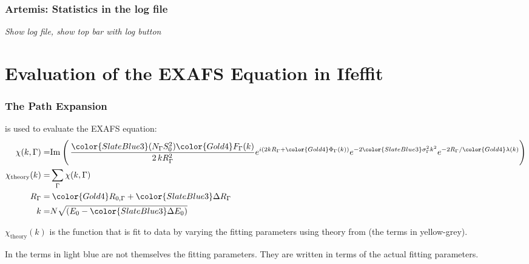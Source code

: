 \documentclass[10pt, xcolor=x11names, compress]{beamer}
\newcommand{\TheBigLesson}{%
  \begin{alertblock}{}
    In {\ifeffit} the {\color{SlateBlue3}terms in light blue} are not
    themselves the fitting parameters.  They are \alert{written in
      terms of} the actual fitting parameters.
  \end{alertblock}
}
\begin{document}

\begin{frame}
  \frametitle{Artemis: Statistics in the log file}
  
  \begin{center}

    \textit{Show log file, show top bar with log button}
  \end{center}
\end{frame}


\section[Ifeffit]{Evaluation of the EXAFS Equation in Ifeffit}
\begin{frame}
  \frametitle{The Path Expansion}

  {\ifeffit} is used to evaluate the EXAFS equation:
  {\small
    \begin{align}
      \chi(k,\Gamma) =& {\Im}\>\Biggl(\, %
      { \frac{{\color{SlateBlue3}(N_\Gamma S_0^2)}{\color{Gold4}F_\Gamma(k)}}
        {2\,kR_\Gamma^2} }
      e^{i(2kR_\Gamma + {\color{Gold4}\Phi_\Gamma(k)})}
      e^{-2{\color{SlateBlue3}\sigma_\Gamma^2}k^2}
      e^{-2R_\Gamma/{\color{Gold4}\lambda(k)}}
      \Biggl) \\
      \chi_{\mathrm{theory}}(k) =& \sum\limits_{\Gamma}\chi(k,\Gamma) \notag\\
      R_\Gamma =& \> {\color{Gold4}R_{0,\Gamma}} +
      {\color{SlateBlue3}\Delta R_\Gamma} \\
      k =& N\sqrt{(E_0 - {\color{SlateBlue3}\Delta E_0})}
    \end{align}}

  \medskip

  $\chi_{\mathrm{theory}}(k)$ is the function that is fit to data by
  varying the fitting parameters using theory from {\feff} (the
  {\color{Gold4}terms in yellow-grey}).

  \bigskip

  \TheBigLesson
\end{frame}
\end{document}
